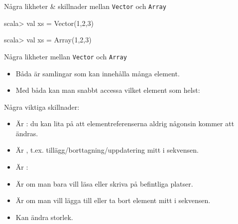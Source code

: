 \begin{Slide}{Några likheter \& skillnader mellan \texttt{Vector} och \texttt{Array}}\SlideFontSmall
\begin{multicols}{2}
\begin{REPLnonum}
scala> val xs = Vector(1,2,3)
\end{REPLnonum}

\columnbreak

\begin{REPLnonum}
scala> val xs = Array(1,2,3)
\end{REPLnonum}
\end{multicols}


Några likheter mellan \texttt{Vector} och \texttt{Array}
\begin{itemize}
\item Båda är samlingar som kan innehålla många element.

\item Med båda kan man snabbt accessa vilket element som helst: 
\end{itemize}
Några viktiga skillnader:

\vspace{-0.5em}\begin{multicols}{2}
\begin{itemize}
\item Är : du kan lita på att elementreferenserna aldrig någonsin kommer att ändras.

\item Är , t.ex. tillägg/borttagning/uppdatering mitt i sekvensen.

\end{itemize}


\columnbreak

\begin{itemize}
\item Är : 

\item Är  om man bara vill läsa eller skriva på befintliga platser.

\item Är  om man vill lägga till eller ta bort element mitt i sekvensen.
\item Kan  ändra storlek.

\end{itemize}
\end{multicols}
\end{Slide}



